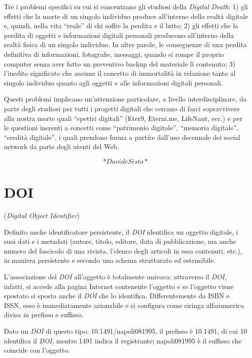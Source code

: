 \documentclass[
  b5paper,
  twoside,
  11pt,
  chapterprefix=false,
  bibliography=totocnumbered,
  listof=flat]{scrbook}
\begin{document}
Tre i problemi specifici su cui si concentrano gli studiosi della
\emph{Digital Death}: 1) gli effetti che la morte di un singolo individuo
produce all'interno della realtà digitale e, quindi, nella vita \enquote{reale}
di chi soffre la perdita e il lutto; 2) gli effetti che la perdita di
oggetti e informazioni digitali personali producono all'interno della
realtà fisica di un singolo individuo. In altre parole, le conseguenze
di una perdita definitiva di informazioni, fotografie, messaggi, quando
si rompe il proprio computer senza aver fatto un preventivo backup del
materiale lì contenuto; 3) l'inedito significato che assume il concetto
di immortalità in relazione tanto al singolo individuo quanto agli
oggetti e alle informazioni digitali personali.

Questi problemi implicano un'attenzione particolare, a livello
interdisciplinare, da parte degli studiosi per tutti i progetti digitali
che cercano di farci sopravvivere alla nostra morte quali \enquote{spettri
digitali} (Eter9, Eterni.me, LifeNaut, ecc.) e per le questioni inerenti
a concetti come \enquote{patrimonio digitale}, \enquote{memoria digitale}, \enquote{eredità
digitale}, i quali prendono forma a partire dall'uso decennale dei
social network da parte degli utenti del Web.

\[*Davide Sisto*\]

\hypertarget{doi}{%
\chapter{DOI}\label{doi}}

(\emph{Digital Object Identifier})

Definito anche identificatore persistente, il \emph{DOI} identifica un
oggetto digitale, i suoi dati e i metadati (autore, titolo, editore,
data di pubblicazione, ma anche numero del fascicolo di una rivista,
l'elenco degli articoli in essa contenuti, etc.), in maniera persistente
e secondo uno schema strutturato ed estensibile.

L'associazione del \emph{DOI} all'oggetto è totalmente univoca: attraverso il
\emph{DOI}, infatti, si accede alla pagina Internet contenente l'oggetto e se
l'oggetto viene spostato si sposta anche il \emph{DOI} che lo identifica.
Differentemente da ISBN e ISSN, esso è immediatamente azionabile e si
configura come siringa alfanumerica divisa in prefisso e suffisso.

Dato un \emph{DOI} di questo tipo: 10.1491/napoli081995, il prefisso è
10.1491, di cui 10 identifica il \emph{DOI}, mentre 1491 indica il
registrante; napoli081995 è il suffisso che coincide con l'oggetto.
\end{document}
